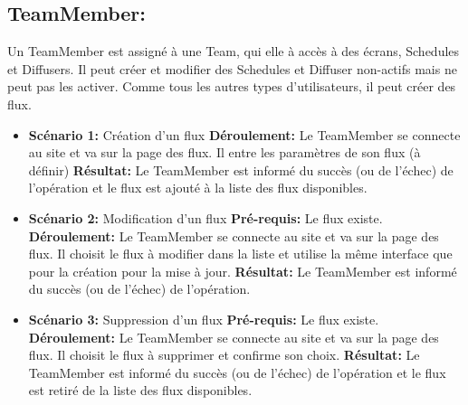 \documentclass[french]{article}
\begin{document}
\begin{appendices}
\begin{itemize}
		\end{itemize}
		
		
	\subsection{TeamMember:} 
	Un TeamMember est assigné à une Team, qui elle à accès à des écrans, Schedules et Diffusers. Il peut créer et modifier des Schedules et Diffuser non-actifs mais ne peut pas les activer. Comme tous les autres types d'utilisateurs, il peut créer des flux. \newline
		\begin{itemize}
			\item \textbf{Scénario 1:} Création d'un flux\newline
			\textbf{Déroulement:} Le TeamMember se connecte au site et va sur la page des flux. Il entre les paramètres de son flux (à définir) \newline
			\textbf{Résultat:} Le TeamMember est informé du succès (ou de l'échec) de l'opération et le flux est ajouté à la liste des flux disponibles.\newline
			
			\item \textbf{Scénario 2:} Modification d'un flux\newline
			\textbf{Pré-requis:} Le flux existe.\newline
			\textbf{Déroulement:} Le TeamMember se connecte au site et va sur la page des flux. Il choisit le flux à modifier dans la liste et utilise la même interface que pour la création pour la mise à jour. \newline
			\textbf{Résultat:} Le TeamMember est informé du succès (ou de l'échec) de l'opération.\newline
			
			\item \textbf{Scénario 3:} Suppression d'un flux\newline
			\textbf{Pré-requis:} Le flux existe.\newline
			\textbf{Déroulement:} Le TeamMember se connecte au site et va sur la page des flux. Il choisit le flux à supprimer et confirme son choix.\newline
			\textbf{Résultat:} Le TeamMember est informé du succès (ou de l'échec) de l'opération et le flux est retiré de la liste des flux disponibles.\newline
			

\end{itemize}
\end{appendices}
\end{document}
